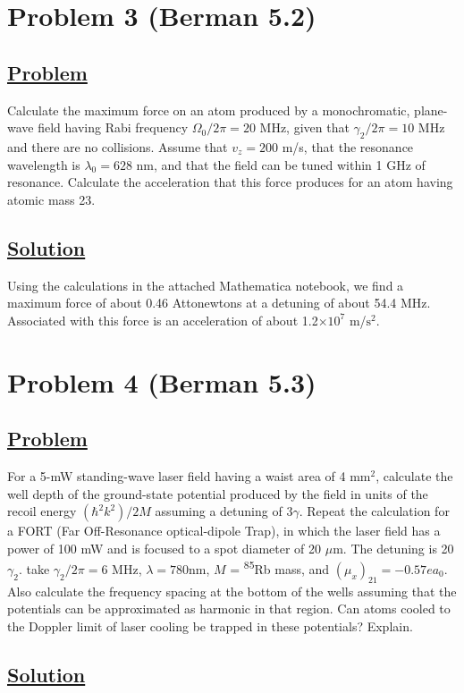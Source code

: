 \documentclass[12pt]{article}
\begin{document}
\section*{Problem 3 (Berman 5.2)}
\subsection*{\underline{Problem}}
Calculate the maximum force on an atom produced by a monochromatic, plane-wave field having Rabi frequency $\Omega_0/2\pi = 2   0$ MHz, given that $\gamma_2/2\pi = 10$ MHz and there are no collisions.
Assume that $v_z = 200$ m/s, that the resonance wavelength is $\lambda_0 = 628$ nm, and that the field can be tuned within 1 GHz of resonance.
Calculate the acceleration that this force produces for an atom having atomic mass 23.

\subsection*{\underline{Solution}}
Using the calculations in the attached Mathematica notebook, we find a maximum force of about 0.46 Attonewtons at a detuning of about 54.4 MHz.
Associated with this force is an acceleration of about 1.2$\times10^7$ m/$\text{s}^2$.


\section*{Problem 4 (Berman 5.3)}
\subsection*{\underline{Problem}}
For a 5-mW standing-wave laser field having a waist area of 4 $\text{mm}^2$, calculate the well depth of the ground-state potential produced by the field in units of the recoil energy $(\hbar^2k^2)/2M$ assuming a detuning of $3\gamma$.
Repeat the calculation for a FORT (Far Off-Resonance optical-dipole Trap), in which the laser field has a power of 100 mW and is focused to a spot diameter of 20 $\mu$m.
The detuning is 20$\gamma_2$. take $\gamma_2/2\pi = 6$ MHz, $\lambda = 780$nm, $M$ = \textsuperscript{85}Rb mass, and $\left(\mu_x\right)_{21} = -0.57ea_0$.
Also calculate the frequency spacing at the bottom of the wells assuming that the potentials can be approximated as harmonic in that region.
Can atoms cooled to the Doppler limit of laser cooling be trapped in these potentials? Explain.

\subsection*{\underline{Solution}}




\end{document}
